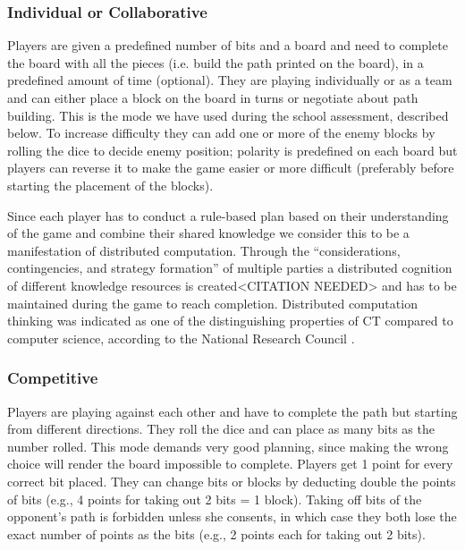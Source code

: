 \documentclass{acm_proc_article-sp}
\begin{document}
\subsubsection{Individual or Collaborative}
Players are given a predefined number of bits and a board and need to complete the board with all the pieces (i.e. build the path printed on the board), in a predefined amount of time (optional). They are playing individually or as a team and can either place a block on the board in turns or negotiate about path building. This is the mode we have used during the school assessment, described below. To increase difficulty they can add one or more of the enemy blocks by rolling the dice to decide enemy position; polarity is predefined on each board but players can reverse it to make the game easier or more difficult (preferably before starting the placement of the blocks).

Since each player has to conduct a rule-based plan based on their understanding of the game and combine their shared knowledge we consider this to be a manifestation of distributed computation. Through the ``considerations, contingencies, and strategy formation'' of multiple parties a distributed cognition of different knowledge resources is created<CITATION NEEDED>\cite{} and has to be maintained during the game to reach completion. Distributed computation thinking was indicated as one of the distinguishing properties of CT compared to computer science, according to the National Research Council \cite{national2010report}.

\subsubsection{Competitive}
Players are playing against each other and have to complete the path but starting from different directions. They roll the dice and can place as many bits as the number rolled. This mode demands very good planning, since making the wrong choice will render the board impossible to complete. Players get 1 point for every correct bit placed. They can change bits or blocks by deducting double the points of bits (e.g., 4 points for taking out 2 bits = 1 block). Taking off bits of the opponent’s path is forbidden unless she consents, in which case they both lose the exact number of points as the bits (e.g., 2 points each for taking out 2 bits).
\end{document}
